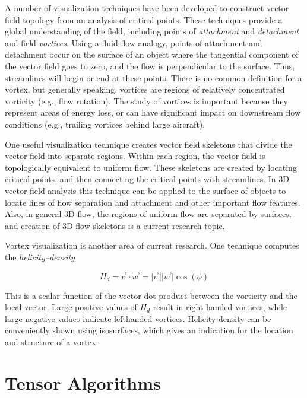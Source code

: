 A number of visualization techniques have been developed to construct vector field topology from an analysis of critical points. These techniques provide a global understanding of the field, including points of \emph{attachment} and \emph{detachment} and field \emph{vortices}. Using a fluid flow analogy, points of attachment and detachment occur on the surface of an object where the tangential component of the vector field goes to zero, and the flow is perpendicular to the surface. Thus, streamlines will begin or end at these points. There is no common definition for a vortex, but generally speaking, vortices are regions of relatively concentrated vorticity (e.g., flow rotation). The study of vortices is important because they represent areas of energy loss, or can have significant impact on downstream flow conditions (e.g., trailing vortices behind large aircraft).

One useful visualization technique creates vector field skeletons that divide the vector field into separate regions. Within each region, the vector field is topologically equivalent to uniform flow. These skeletons are created by locating critical points, and then connecting the critical points with streamlines. In 3D vector field analysis this technique can be applied to the surface of objects to locate lines of flow separation and attachment and other important flow features. Also, in general 3D flow, the regions of uniform flow are separated by surfaces, and creation of 3D flow skeletons is a current research topic.

Vortex visualization is another area of current research. One technique computes the \emph{helicity--density}

\begin{equation}\label{eq:9.12}
H_d = \overrightarrow{v\ } \cdot \overrightarrow{w\ } = \vert \overrightarrow{v\ } \vert \vert \overrightarrow{w\ } \vert \cos(\phi)
\end{equation}

This is a scalar function of the vector dot product between the vorticity and the local vector. Large positive values of $H_d$ result in right-handed vortices, while large negative values indicate lefthanded vortices. Helicity-density can be conveniently shown using isosurfaces, which gives an indication for the location and structure of a vortex.

\section{Tensor Algorithms}

